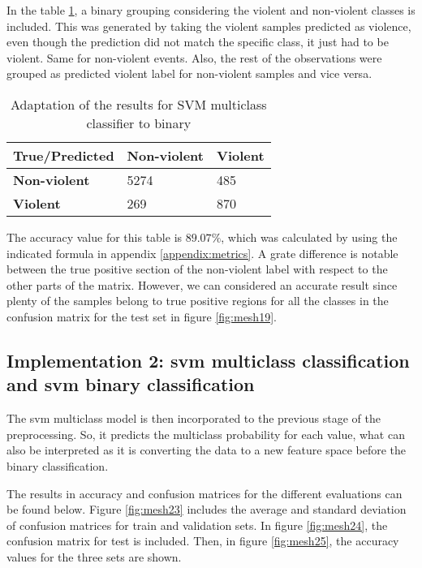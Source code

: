 	In the table \ref{table:11}, a binary grouping considering the violent and non-violent classes is included. This was generated by taking the violent samples predicted as violence, even though the prediction did not match the specific class, it just had to be violent. Same for non-violent events. Also, the rest of the observations were grouped as predicted violent label for non-violent samples and vice versa.
	
	\begin{table}[H]
	\begin{center}
		\begin{tabular}{| m{6em} || m{6em} | m{6em} ||}
			\hline
			True/Predicted & \textbf{Non-violent} & \textbf{Violent} \\
			\hline\hline
			\textbf{Non-violent} & 5274 & 485 \\
			\hline
			\textbf{Violent} & 269 & 870 \\
			\hline
		\end{tabular}
	\end{center}
	\caption{Adaptation of the results for SVM multiclass classifier to binary}
	\label{table:11}
	\end{table}

	The accuracy value for this table is $89.07\%$, which was calculated by using the indicated formula in appendix \ref{appendix:metrics}. A grate difference is notable between the true positive section of the non-violent label with respect to the other parts of the matrix. However, we can considered an accurate result since plenty of the samples belong to true positive regions for all the classes in the confusion matrix for the test set in figure \ref{fig:mesh19}.

\subsection{Implementation 2: \acrshort{svm} multiclass classification and \acrshort{svm} binary classification}

	The \acrshort{svm} multiclass model is then incorporated to the previous stage of the preprocessing. So, it predicts the multiclass probability for each value, what can also be interpreted as it is converting the data to a new feature space before the binary classification.
	
	The results in accuracy and confusion matrices for the different evaluations can be found below. Figure \ref{fig:mesh23} includes the average and standard deviation of confusion matrices for train and validation sets. In figure \ref{fig:mesh24}, the confusion matrix for test is included. Then, in figure \ref{fig:mesh25}, the accuracy values for the three sets are shown.


